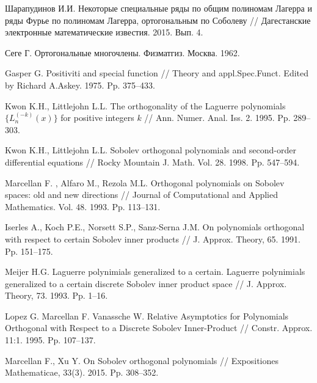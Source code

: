 \begin{thebibliography}{99}
{Шарапудинов И.И.}
Некоторые специальные ряды по общим полиномам Лагерра и ряды Фурье по полиномам Лагерра, ортогональным по Соболеву
// Дагестанские электронные математические известия. 2015. Вып. 4.



{Сеге Г.} Ортогональные многочлены. Физматгиз. Москва. 1962.



{Gasper G.}
Positiviti and special function
// Theory and appl.Spec.Funct. Edited by Richard A.Askey. 1975. Pp. 375--433.



{Kwon K.H., Littlejohn L.L.}
The orthogonality of the Laguerre polynomials $\{L_n^{(-k)}(x)\}$ for positive integers $k$
// Ann. Numer. Anal. Iss. 2. 1995. Pp. 289--303.



{Kwon K.H., Littlejohn L.L.}
Sobolev orthogonal polynomials and second-order differential equations
// Rocky Mountain J. Math. Vol. 28. 1998. Pp. 547--594.



{Marcellan F. , Alfaro M., Rezola M.L.} Orthogonal polynomials on Sobolev spaces: old and new directions
// Journal of Computational and Applied Mathematics. Vol. 48. 1993. Pp. 113--131.



{ Iserles A., Koch P.E., Norsett S.P., Sanz-Serna J.M.}
On polynomials  orthogonal  with respect  to certain Sobolev inner products
// J. Approx. Theory, 65. 1991. Pp. 151--175.



{Meijer H.G.} Laguerre polynimials generalized to a certain.
Laguerre polynimials generalized to a certain discrete Sobolev inner product space
// J. Approx. Theory, 73. 1993. Pp. 1--16.



{Lopez G. Marcellan F. Vanassche W.}
Relative Asymptotics for Polynomials Orthogonal with Respect to a Discrete Sobolev Inner-Product
// Constr. Approx. 11:1. 1995. Pp. 107--137.



{Marcellan F., Xu Y.}
On Sobolev orthogonal polynomials
// Expositiones Mathematicae, 33(3). 2015. Pp. 308--352.




\end{thebibliography}
